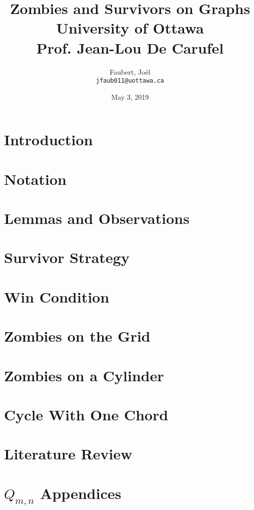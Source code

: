 \documentclass[letterpaper, 12pt]{report}
\author{
  Faubert, Jo\"el\\	\texttt{jfaub011@uottawa.ca}
}
\title{
	{Zombies and Survivors on Graphs}\\
	{\large University of Ottawa} \\
  {\large Prof. Jean-Lou De Carufel}
}
\date{May 3, 2019}
\theoremstyle{definition}
\begin{document}
\nocite{*}

\hypersetup{pageanchor=false}
\begin{titlepage}
\maketitle
\end{titlepage}
\hypersetup{pageanchor=true}


%

\tableofcontents

\cleardoublepage{}

\section{Introduction}


\section{Notation}


\section{Lemmas and Observations}


\section{Survivor Strategy}


\section{Win Condition}


\section{Zombies on the Grid}


\section{Zombies on a Cylinder}


\section{Cycle With One Chord}


\section{Literature Review}


\newpage



\newpage
\appendix
\section{$Q_{m, n}$ Appendices}

\end{document}
